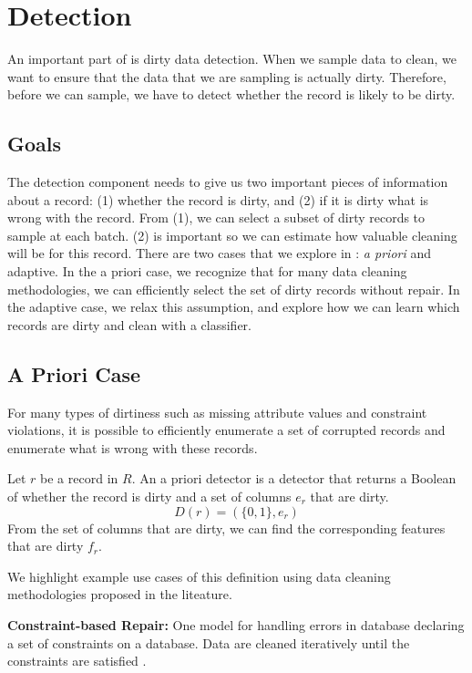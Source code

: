 \section{Detection}\label{det}
An important part of \sys is dirty data detection.
When we sample data to clean, we want to ensure that the data that we are sampling is actually dirty.
Therefore, before we can sample, we have to detect whether the record is likely to be dirty.

\subsection{Goals}
The detection component needs to give us two important pieces of information about a record: (1) whether the record is dirty, and (2) if it is dirty what is wrong with the record.
From (1), we can select a subset of dirty records to sample at each batch. 
(2) is important so we can estimate how valuable cleaning will be for this record.
There are two cases that we explore in \sys: \emph{a priori} and adaptive.
In the a priori case, we recognize that for many data cleaning methodologies, we can efficiently select the set of dirty records without repair.
In the adaptive case, we relax this assumption, and explore how we can learn which records are dirty and clean with a classifier.

\subsection{A Priori Case}
For many types of dirtiness such as missing attribute values and constraint violations, it is possible to efficiently enumerate a set of corrupted records and enumerate what is wrong with these records.

\begin{definition}
Let $r$ be a record in $R$. An a priori detector is a detector that returns a Boolean of whether the record is dirty and a set of columns $e_r$ that are dirty.
\[
D(r) = (\{0,1\}, e_r)
\]
From the set of columns that are dirty, we can find the corresponding features that are dirty $f_r$.
\end{definition}

\noindent We highlight example use cases of this definition using data cleaning methodologies proposed in the liteature.

\vspace{0.5em}

\noindent\textbf{Constraint-based Repair: }
One model for handling errors in database declaring a set of constraints on a database.
Data are cleaned iteratively until the constraints are satisfied \cite{DBLP:journals/pvldb/YakoutENOI11, DBLP:journals/pvldb/FanLMTY10, khayyat2015bigdansing}.

